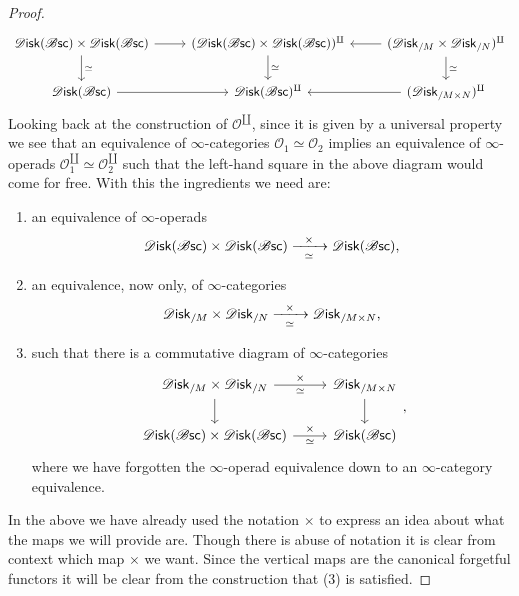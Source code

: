 \documentclass[../text.tex]{subfiles}
\begin{document}
\begin{proof}
    \begin{equation}
        \begin{tikzcd}
            \disk(\bsc) \times \disk(\bsc) \arrow[r] \arrow[d, "\simeq"] & (\disk(\bsc) \times \disk(\bsc))^{\amalg} \arrow[d, "\simeq"] & (\disk_{/M} \times \disk_{/N})^{\amalg} \arrow[l] \arrow[d, "\simeq"] \\
            \disk(\bsc) \arrow[r] & \disk(\bsc)^{\amalg} & (\disk_{/M \times N})^{\amalg} \arrow[l]
        \end{tikzcd}
    \end{equation}
    Looking back at the construction \cite[Con.2.4.3.1]{lurie_ha} of $\mathscr{O}^{\coprod}$, since it is given by a universal property we see that an equivalence of $\infty$-categories $\mathscr{O}_1 \simeq \mathscr{O}_2$ implies an equivalence of $\infty$-operads $\mathscr{O}_1^{\amalg} \simeq \mathscr{O}_2^{\amalg}$ such that the left-hand square in the above diagram would come for free. With this the ingredients we need are:
    \begin{enumerate}
        \item an equivalence of $\infty$-operads
        \begin{equation}
            \disk(\bsc) \times \disk(\bsc) \xrightarrow[\ \ \simeq \ \ ]{\times} \disk(\bsc),
        \end{equation}
        \item an equivalence, now only, of $\infty$-categories
        \begin{equation}
            \disk_{/M} \times \disk_{/N} \xrightarrow[\ \ \simeq \ \ ]{\times} \disk_{/M \times N},
        \end{equation}
        \item such that there is a commutative diagram of $\infty$-categories
        \begin{equation}
            \begin{tikzcd}
                \disk_{/M} \times \disk_{/N} \arrow[r, "\times", "\simeq"'] \arrow[d] & \disk_{/M \times N} \arrow[d] \\
                \disk(\bsc) \times \disk(\bsc) \arrow[r, "\times", "\simeq"'] & \disk(\bsc)
            \end{tikzcd},
        \end{equation}
        where we have forgotten the $\infty$-operad equivalence down to an $\infty$-category equivalence.
    \end{enumerate}
    In the above we have already used the notation $\times$ to express an idea about what the maps we will provide are. Though there is abuse of notation it is clear from context which map $\times$ we want. Since the vertical maps are the canonical forgetful functors it will be clear from the construction that (3) is satisfied.


\end{proof}
\end{document}
